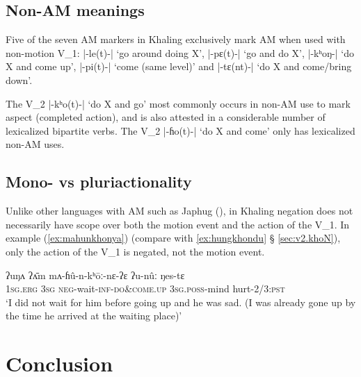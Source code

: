 \documentclass[oneside,a4paper,11pt]{article}
\newcommand{\ipa}[1]{{\phon#1}}
\newcommand{\dhatu}[2]{|\ipa{#1}| `#2'}
\begin{document}
 \subsection{Non-AM meanings} \label{sec:non.am}
Five of the seven AM markers in Khaling exclusively mark AM when used with non-motion V_1: \dhatu{-le(t)-}{go around doing X}, \dhatu{-pɛ(t)-}{go and do X},  \dhatu{-kʰoŋ-}{do X and come up}, \dhatu{-pi(t)-}{come (same level)} and \dhatu{-tɛ(nt)-}{do X and come/bring down}.

 The V_2   \dhatu{-kʰo(t)-}{do X and go} most commonly occurs in non-AM use to mark aspect (completed action), and is also attested in a considerable number of lexicalized bipartite verbs. The V_2  \dhatu{-ɦo(t)-}{do X and come} only has lexicalized non-AM uses. 
  
\subsection{Mono- vs pluriactionality} \label{sec:pluriactionality}

Unlike other languages with AM such as Japhug (\citealt[202-203]{jacques13harmonization}), in Khaling negation does not necessarily have scope over both the motion event and the action of the V_1. In example (\ref{ex:mahunkhonya}) (compare with \ref{ex:hungkhondu} § \ref{sec:v2.khoN}), only the action of the V_1 is negated, not the motion event.  

\begin{exe}
\ex \label{ex:mahunkhonya}
 \gll
\ipa{ʔuŋʌ} \ipa{ʔʌ̄m} \ipa{mʌ-ɦû-n-kʰōː-nɛ-ʔɛ} \ipa{ʔu-nûː} \ipa{ŋes-tɛ} \\
\textsc{1sg}.\textsc{erg} \textsc{3sg} \textsc{neg}-wait-\textsc{inf}-\textsc{do\&come.up} \textsc{3sg}.\textsc{poss}-mind hurt-2/3:\textsc{pst} \\
\glt `I did not wait for him before going up and he was sad. (I was already gone up by the time he arrived at the waiting place)'
\end{exe}

 

\section{Conclusion}



\end{document}
